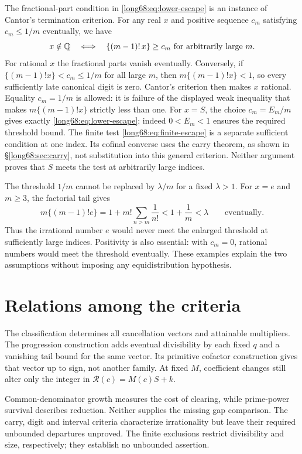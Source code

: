\documentclass[11pt]{article}
\begin{document}
The fractional-part condition in \eqref{long68:eq:lower-escape} is an
instance of Cantor's termination criterion. For any real $x$ and
positive sequence $c_m$ satisfying $c_m\le1/m$ eventually, we have
\[
 x\notin\mathbb{Q}
 \quad\Longleftrightarrow\quad
 \{(m-1)!\,x\}\ge c_m\ \hbox{for arbitrarily large }m .
\]
For rational $x$ the fractional parts vanish eventually. Conversely, if
$\{(m-1)!x\}<c_m\le1/m$ for all large $m$, then
$m\{(m-1)!x\}<1$, so every sufficiently late canonical digit is zero.
Cantor's criterion then makes $x$ rational. Equality $c_m=1/m$ is allowed:
it is failure of the displayed weak inequality that makes
$m\{(m-1)!x\}$ strictly less than one.
For $x=S$, the choice $c_m=E_m/m$ gives exactly
\eqref{long68:eq:lower-escape}; indeed $0<E_m<1$ ensures the required
threshold bound. The finite test \eqref{long68:eq:finite-escape} is a
separate sufficient condition at one index. Its cofinal converse uses
the carry theorem, as shown in \S\ref{long68:sec:carry}, not substitution
into this general criterion. Neither argument proves that $S$ meets
the test at arbitrarily large indices.

The threshold $1/m$ cannot be replaced by $\lambda/m$ for a fixed
$\lambda>1$. For $x=e$ and $m\ge3$, the factorial tail gives
\[
 m\{(m-1)!e\}
 =1+m!\sum_{n>m}\frac1{n!}<1+\frac1m<\lambda
 \qquad\text{eventually}.
\]
Thus the irrational number $e$ would never meet the enlarged threshold
at sufficiently large indices. Positivity is also essential: with
$c_m=0$, rational numbers would meet the threshold eventually. These
examples explain the two assumptions without imposing any
equidistribution hypothesis.
\section{Relations among the criteria}\label{sec:erdos-68-complete-family-map}
The classification determines all cancellation vectors and attainable
multipliers. The progression construction adds eventual divisibility
by each fixed $q$ and a vanishing tail bound for the same vector.
Its primitive cofactor construction gives that vector up to sign, not
another family. At fixed $M$, coefficient changes still alter only the
integer in $\mathcal R(c)=M(c)S+k$.

Common-denominator growth measures the cost of clearing, while
prime-power survival describes reduction. Neither supplies the missing
gap comparison. The carry, digit and interval criteria characterize
irrationality but leave their required unbounded departures unproved.
The finite exclusions restrict divisibility and size, respectively;
they establish no unbounded assertion.
\end{document}
